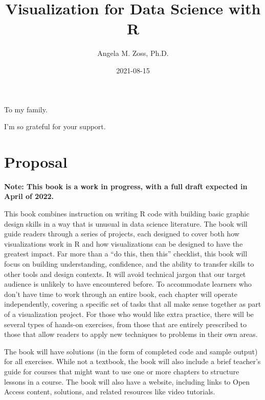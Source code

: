 \documentclass[
]{krantz}
\title{Visualization for Data Science with R}
\author{Angela M. Zoss, Ph.D.}
\date{2021-08-15}
\begin{document}
\maketitle


\thispagestyle{empty}

\begin{center}
To my family.

I'm so grateful for your support.
\end{center}

\setlength{\abovedisplayskip}{-5pt}
\setlength{\abovedisplayshortskip}{-5pt}

{
\hypersetup{linkcolor=}
\setcounter{tocdepth}{2}
\tableofcontents
}
\listoftables
\listoffigures
\hypertarget{proposal}{%
\chapter*{Proposal}\label{proposal}}


\textbf{Note: This book is a work in progress, with a full draft expected in April of 2022.}

This book combines instruction on writing R code with building basic graphic design skills in a way that is unusual in data science literature. The book will guide readers through a series of projects, each designed to cover both how visualizations work in R and how visualizations can be designed to have the greatest impact. Far more than a ``do this, then this'' checklist, this book will focus on building understanding, confidence, and the ability to transfer skills to other tools and design contexts. It will avoid technical jargon that our target audience is unlikely to have encountered before. To accommodate learners who don't have time to work through an entire book, each chapter will operate independently, covering a specific set of tasks that all make sense together as part of a visualization project. For those who would like extra practice, there will be several types of hands-on exercises, from those that are entirely prescribed to those that allow readers to apply new techniques to problems in their own areas.

The book will have solutions (in the form of completed code and sample output) for all exercises. While not a textbook, the book will also include a brief teacher's guide for courses that might want to use one or more chapters to structure lessons in a course. The book will also have a website, including links to Open Access content, solutions, and related resources like video tutorials.
\end{document}
